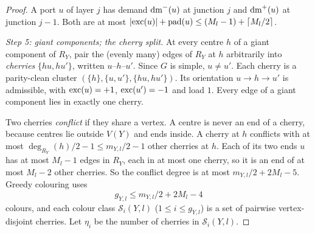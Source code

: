 \begin{proof}
A port $u$ of layer $j$ has demand $\mathrm{dm}^-(u)$ at junction $j$ and $\mathrm{dm}^+(u)$ at junction $j-1$. Both are at most $|\mathrm{exc}(u)|+\mathrm{pad}(u)\le(M_l-1)+\lceil M_l/2\rceil$.

\emph{Step 5: giant components; the cherry split.} At every centre $h$ of a giant component of $R_Y$, pair the (evenly many) edges of $R_Y$ at $h$ arbitrarily into \emph{cherries} $\{hu,hu'\}$, written $u$--$h$--$u'$. Since $G$ is simple, $u\neq u'$. Each cherry is a parity-clean cluster $(\{h\},\{u,u'\},\{hu,hu'\})$. Its orientation $u\to h\to u'$ is admissible, with $\mathrm{exc}(u)=+1$, $\mathrm{exc}(u')=-1$ and load $1$. Every edge of a giant component lies in exactly one cherry.

Two cherries \emph{conflict} if they share a vertex. A centre is never an end of a cherry, because centres lie outside $V(Y)$ and ends inside. A cherry at $h$ conflicts with at most $\deg_{R_Y}(h)/2-1\le m_{Y,l}/2-1$ other cherries at $h$. Each of its two ends $u$ has at most $M_l-1$ edges in $R_Y$, each in at most one cherry, so it is an end of at most $M_l-2$ other cherries. So the conflict degree is at most $m_{Y,l}/2+2M_l-5$. Greedy colouring uses
\[
g_{Y,l}\le m_{Y,l}/2+2M_l-4
\]
colours, and each colour class $\mathcal S_i(Y,l)$ ($1\le i\le g_{Y,l}$) is a set of pairwise vertex-disjoint cherries. Let $\eta_i$ be the number of cherries in $\mathcal S_i(Y,l)$.


\end{proof}
